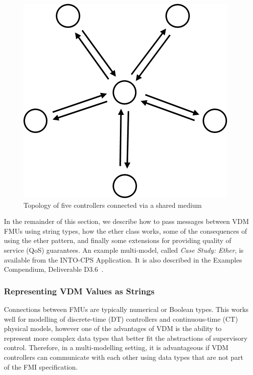 \begin{figure}[hb]
\centering
\includegraphics[scale=0.4]{figures/bigraph2}
\caption{Topology of five controllers connected via a shared medium}
\label{fig:bigraph2}
\end{figure}

In the remainder of this section, we describe how to pass messages between VDM FMUs using string types, how the ether class works, some of the consequences of using the ether pattern, and finally some extensions for providing quality of service (QoS) guarantees. %
An example multi-model, called \emph{Case Study: Ether}, is available from the INTO-CPS Application. It is also described in the Examples Compendium, Deliverable D3.6~\cite{INTOCPSD3.6}.

\subsubsection{Representing VDM Values as Strings}

Connections between FMUs are typically numerical or Boolean types. This works well for modelling of discrete-time (DT) controllers and continuous-time (CT) physical models, however one of the advantages of VDM is the ability to represent more complex data types that better fit the abstractions of supervisory control. Therefore, in a multi-modelling setting, it is advantageous if VDM controllers can communicate with each other using data types that are not part of the FMI specification.

